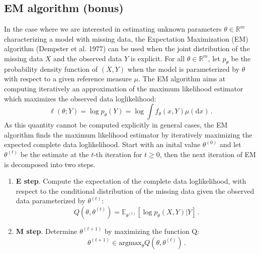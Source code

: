 \documentclass[a4paper,10pt,fleqn]{article}
\newcommand{\eqsp}{\,}
\newcommand{\1}{\ensuremath{\mathbbm{1}}}
\begin{document}
\subsection*{EM algorithm (bonus)}
In the case where we are interested in estimating unknown parameters $\theta\in\mathbb{R}^m$ characterizing a model with missing data, the Expectation Maximization (EM) algorithm (Dempster et al. 1977) can be used when the joint distribution of the missing data $X$ and the observed data $Y$ is explicit. For all $\theta\in\mathbb{R}^m$, let $p_{\theta}$ be the probability density function of $(X,Y)$ when the model is parameterized by $\theta$ with respect to a given reference measure $\mu$. The EM algorithm aims at computing iteratively an approximation of the maximum likelihood estimator which maximizes the observed data loglikelihood:
$$
\ell(\theta;Y) = \log p_{\theta}(Y) =\log \int f_{\theta}(x,Y)\mu(\mathrm{d}x)\eqsp.
$$
As this quantity cannot be computed explicitly in general cases, the EM algorithm finds the maximum likelihood estimator by iteratively maximizing the expected complete data loglikelihood.
Start with an inital value $\theta^{(0)}$ and let $\theta^{(t)}$ be the estimate at the $t$-th iteration for $t\geqslant 0$, then the next iteration of EM is decomposed into two steps.
\begin{enumerate}
\item {\bf E step}. Compute the expectation of the complete data loglikelihood, with respect to the conditional distribution of the missing data given the observed data parameterized by $\theta^{(t)}$:
$$
Q(\theta,\theta^{(t)}) =\mathbb{E}_{\theta^{(t)}}\left[\log p_{\theta}(X,Y)|Y \right]\eqsp.%
$$
\item {\bf M step}. Determine $\theta^{(t+1)}$ by maximizing the function Q:
$$
\theta^{(t+1)}\in \mbox{argmax}_\theta Q(\theta,\theta^{(t)})\eqsp.
$$
\end{enumerate}
\end{document}
